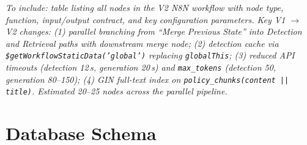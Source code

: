 \documentclass[10pt,a4paper]{report}
\begin{document}
\begin{tcolorbox}[colback=gray!6!white, colframe=gray!50!black, title=\textbf{Placeholder --- N8N Workflow Node Inventory}, left=4pt, right=4pt]
\textit{To include: table listing all nodes in the V2 N8N workflow with node type, function, input/output contract, and key configuration parameters. Key V1 $\to$ V2 changes: (1) parallel branching from ``Merge Previous State'' into Detection and Retrieval paths with downstream merge node; (2) detection cache via \texttt{\$getWorkflowStaticData('global')} replacing \texttt{globalThis}; (3) reduced API timeouts (detection 12\,s, generation 20\,s) and \texttt{max\_tokens} (detection 50, generation 80--150); (4) GIN full-text index on \texttt{policy\_chunks(content || title)}. Estimated 20--25 nodes across the parallel pipeline.}
\end{tcolorbox}

\chapter{Database Schema}
\label{app:schema}
\end{document}
